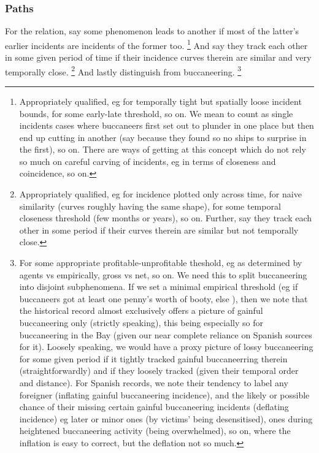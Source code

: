 		\subsubsection{Paths} %
		For the relation, say some phenomenon  leads to another if most of the latter's earlier incidents are incidents of the former too.%
		\footnote{Appropriately qualified, eg for temporally tight but spatially loose incident bounds, for some early-late threshold, so on. We mean to count as single incidents cases where buccaneers first set out to plunder in one place but then end up cutting in another (say because they found so no ships to surprise in the first), so on. There are ways of getting at this concept which do not rely so much on careful carving of incidents, eg in terms of closeness and coincidence, so on.}
		And say they  track each other in some given period of time if their incidence curves therein are similar and very temporally close.%
		\footnote{Appropriately qualified, eg for incidence plotted only across time, for naive similarity (curves roughly having the same shape), for some temporal closeness threshold (few months or years), so on. Further, say they  track each other in some period if their curves therein are similar but not temporally close.}
		And lastly distinguish  from  buccaneering.%
		\footnote{For some appropriate profitable-unprofitable theshold, eg as determined by agents vs empirically, gross vs net, so on. We need this to split buccaneering into disjoint subphenomena. If we set a minimal empirical threshold (eg  if buccaneers got at least one penny's worth of booty, else ), then we note that the historical record almost exclusively offers a picture of gainful buccaneering only (strictly speaking), this being especially so for buccaneering in the Bay (given our near complete reliance on Spanish sources for it). Loosely speaking, we would have a proxy picture of lossy buccaneering for some given period if it tightly tracked gainful buccaneerring therein (straightforwardly) and if they loosely tracked (given their temporal order and distance). For Spanish records, we note their tendency to label any foreigner  (inflating gainful buccaneering incidence), and the likely or possible chance of their missing certain gainful buccaneering incidents (deflating incidence) eg later or minor ones (by victims' being desensitised), ones during heightened buccaneering activity (being overwhelmed), so on, where the inflation is easy to correct, but the deflation not so much.}
